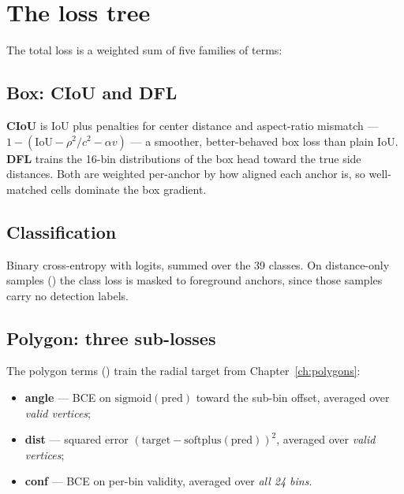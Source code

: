 \section{The loss tree}
The total loss is a weighted sum of five families of terms:

\begin{center}
\end{center}

\subsection{Box: CIoU and DFL}
\textbf{CIoU} is IoU plus penalties for center distance and aspect-ratio mismatch ---
$1-(\text{IoU}-\rho^2/c^2-\alpha v)$ --- a smoother, better-behaved box loss than plain
IoU. \textbf{DFL} trains the 16-bin distributions of the box head toward the true side
distances. Both are weighted per-anchor by how aligned each anchor is, so well-matched
cells dominate the box gradient.

\subsection{Classification}
Binary cross-entropy with logits, summed over the 39 classes. On distance-only samples
() the class loss is masked to foreground anchors, since those samples
carry no detection labels.

\subsection{Polygon: three sub-losses}
The polygon terms () train the radial target from
Chapter~\ref{ch:polygons}:
\begin{itemize}[leftmargin=1.4em,itemsep=1pt]
  \item \textbf{angle} --- BCE on $\text{sigmoid}(\text{pred})$ toward the sub-bin offset,
        averaged over \emph{valid vertices};
  \item \textbf{dist} --- squared error $(\text{target}-\text{softplus}(\text{pred}))^2$,
        averaged over \emph{valid vertices};
  \item \textbf{conf} --- BCE on per-bin validity, averaged over \emph{all 24 bins}.
\end{itemize}

